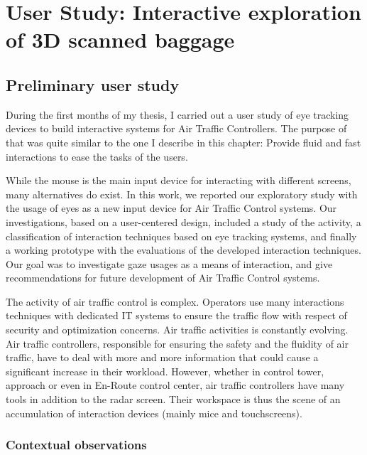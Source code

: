\chapter{User Study: Interactive exploration of 3D scanned baggage} %
\label{DesignStudy}

\section{ Preliminary user study }
During the first months of my thesis, I carried out a user study of eye tracking devices to build interactive systems for Air Traffic Controllers. The purpose of that was quite similar to the one I describe in this chapter: Provide fluid and fast interactions to ease the tasks of the users. 


While the mouse is the main input device for interacting with different screens, many alternatives do exist. In this work, we reported our exploratory study with the usage of
eyes as a new input device for Air Traffic Control systems. Our investigations, based on a user-centered design, included a study of the activity, a classification of interaction
techniques based on eye tracking systems, and finally a working prototype with the evaluations of the developed interaction techniques. Our goal was to investigate gaze usages
as a means of interaction, and give recommendations for future development of Air Traffic Control systems.


The activity of air traffic control is complex. Operators use many interactions techniques with dedicated IT systems to ensure the traffic flow with respect of security and
optimization concerns. Air traffic activities is constantly evolving. Air traffic
controllers, responsible for ensuring the safety and the fluidity of air traffic, have to deal with more and more information that could cause a significant increase in their
workload. However, whether in control tower, approach or even in En-Route control center, air traffic controllers have many tools in addition to the radar screen. Their
workspace is thus the scene of an accumulation of interaction devices (mainly mice and touchscreens).

\subsection{ Contextual observations }


